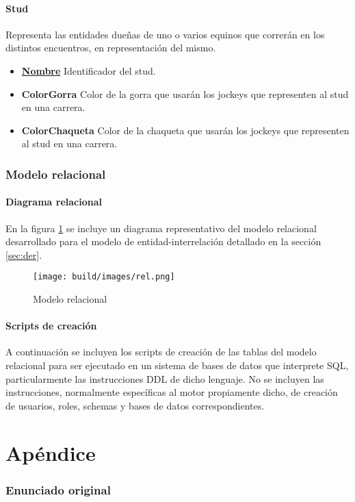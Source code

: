\documentclass[a4paper,11pt]{article}
\begin{document}
\subsection{Stud}

Representa las entidades dueñas de uno o varios equinos que correrán en los distintos
 encuentros, en representación del mismo.

\begin{itemize}

	\item \textbf{\uline{Nombre}} Identificador del stud.
	
	\item \textbf{ColorGorra} Color de la gorra que usarán los jockeys que 
	representen al stud en una carrera.
	
	\item \textbf{ColorChaqueta} Color de la chaqueta que usarán los jockeys 
	que representen al stud en una carrera.
	
\end{itemize}

\section{Modelo relacional}

\subsection{Diagrama relacional}

En la figura \ref{fig:relacional} se incluye un diagrama representativo del
modelo relacional desarrollado para el modelo de entidad-interrelación
detallado en la sección \ref{sec:der}.

\begin{figure}[h!t]
  \centering
  \texttt{[image: build/images/rel.png]}
  \caption{Modelo relacional} \label{fig:relacional}
\end{figure}

\FloatBarrier

\subsection{Scripts de creación}

A continuación se incluyen los scripts de creación de las tablas del modelo
relacional para ser ejecutado en un sistema de bases de datos que interprete
SQL, particularmente las instrucciones DDL de dicho lenguaje. No se incluyen
las instrucciones, normalmente específicas al motor propiamente dicho, de
creación de usuarios, roles, schemas y bases de datos correspondientes.



\clearpage

\part{Apéndice}
\appendix

\section{Enunciado original}\label{sec:enunciado}

\end{document}
